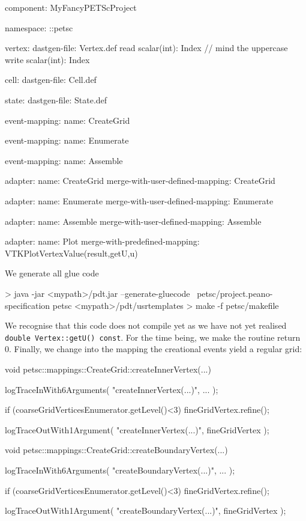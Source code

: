 \begin{code}
component: MyFancyPETScProject

namespace: ::petsc

vertex:
  dastgen-file: Vertex.def
  read scalar(int): Index   // mind the uppercase
  write scalar(int): Index
  
cell:
  dastgen-file: Cell.def

state:
  dastgen-file: State.def

event-mapping:
  name: CreateGrid

event-mapping:
  name: Enumerate

event-mapping:
  name: Assemble

adapter:
  name: CreateGrid
  merge-with-user-defined-mapping: CreateGrid

adapter:
  name: Enumerate
  merge-with-user-defined-mapping: Enumerate

adapter:
  name: Assemble
  merge-with-user-defined-mapping: Assemble
 
adapter:
  name: Plot
  merge-with-predefined-mapping: VTKPlotVertexValue(result,getU,u)
\end{code}

We generate all glue code
\begin{code}
> java -jar <mypath>/pdt.jar --generate-gluecode \
  petsc/project.peano-specification petsc <mypath>/pdt/usrtemplates
> make -f petsc/makefile
\end{code}

\noindent
We recognise that this code does not compile yet as we have not yet realised \texttt{double Vertex::getU() const}.
For the time being, we make the routine return 0.
Finally, we change into the mapping the creational events yield a regular grid:

\begin{code}
void petsc::mappings::CreateGrid::createInnerVertex(...) {
  logTraceInWith6Arguments( "createInnerVertex(...)", ... );

  if (coarseGridVerticesEnumerator.getLevel()<3) {
	fineGridVertex.refine();
  }

  logTraceOutWith1Argument( "createInnerVertex(...)", fineGridVertex );
}


void petsc::mappings::CreateGrid::createBoundaryVertex(...) {
  logTraceInWith6Arguments( "createBoundaryVertex(...)", ... );

  if (coarseGridVerticesEnumerator.getLevel()<3) {
	fineGridVertex.refine();
  }

  logTraceOutWith1Argument( "createBoundaryVertex(...)", fineGridVertex );
}
\end{code}

